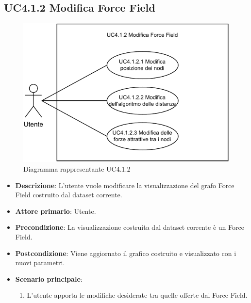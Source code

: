 \subsection{UC4.1.2 Modifica Force Field}
\label{subsec:uc4.1.2}
\begin{figure}[h]
    \centering
    \includegraphics[width=0.6  \textwidth]{componenti/casi-duso/diagrammi/UC4.1.2.pdf}
    \caption{Diagramma rappresentante UC4.1.2}
    \label{fig:UC2}
\end{figure}


\begin{itemize}
    \item \textbf{Descrizione}: L’utente vuole modificare la visualizzazione del grafo Force Field
                                costruito dal dataset corrente.
	
    \item \textbf{Attore primario}: Utente.
    
    \item \textbf{Precondizione}:   La visualizzazione costruita dal dataset corrente è un Force Field.

    \item \textbf{Postcondizione}:  Viene aggiornato il grafico costruito e visualizzato con i nuovi parametri.

	\item \textbf{Scenario principale}:
		\begin{enumerate}
            \item L'utente apporta le modifiche desiderate tra quelle offerte dal Force Field.
        \end{enumerate}
\end{itemize}

